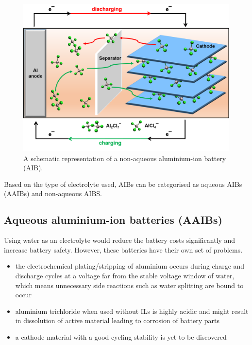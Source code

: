 \begin{figure}[tbh!]
\centering
\includegraphics[width=\textwidth]{Figures/chap1fig/AIBmech}
\caption{A schematic representation of a non-aqueous aluminium-ion battery (AIB).}
\label{Figures/chap1fig:AIBmech}
\end{figure}

Based on the type of electrolyte used, AIBs can be categorised as aqueous AIBs (AAIBs) and non-aqueous AIBS.  

\subsection{Aqueous aluminium-ion batteries (AAIBs)}
Using water as an electrolyte would reduce the battery costs significantly and increase battery safety. However, these batteries have their own set of problems. 

\begin{itemize}
    \item the electrochemical plating/stripping of aluminium occurs during charge and discharge cycles at a voltage far from the stable voltage window of water, which means unnecessary side reactions such as water splitting are bound to occur
    \item aluminium trichloride  when used without ILs is highly acidic and might result in dissolution of active material leading to corrosion of battery parts
    \item a cathode material with a good cycling stability is yet to be discovered
\end{itemize}  

